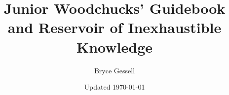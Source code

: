 \documentclass[10pt]{article} %
\title{Junior Woodchucks' Guidebook and Reservoir of Inexhaustible Knowledge}
\author{Bryce Gessell}
\date{Updated \today}
\begin{document}
\maketitle
\thispagestyle{empty}

\begin{center}
\end{center}

\pagebreak{}


\tableofcontents

\pagebreak{}

	
	
	
	
	
	
	
	
	
	
	
	
	
	
	
	
\end{document}
